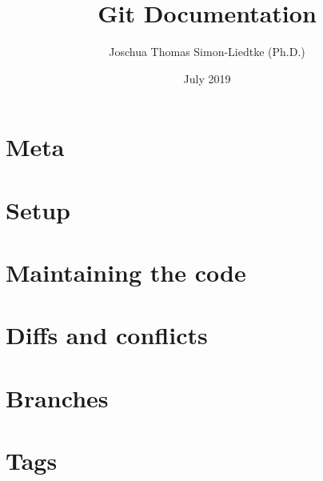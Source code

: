 \documentclass{report}
\title{Git Documentation}
\author{Joschua Thomas Simon-Liedtke (Ph.D.)}
\date{July 2019}
\begin{document}


\chapter*{Meta}



\chapter{Setup}



\chapter{Maintaining the code}



\chapter{Diffs and conflicts}



\chapter{Branches}



\chapter{Tags}


\end{document}
